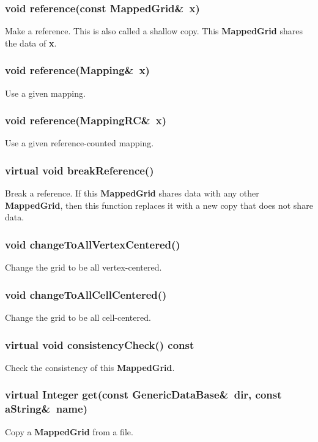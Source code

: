 \documentclass{article}
\begin{document}
  \subsubsection{void reference(const MappedGrid\&~x)}
  \label{MappedGrid::reference(MappedGrid_x)}
    Make a reference.  This is also called a shallow copy.  This \textbf{MappedGrid} shares the data of \textbf{x}.
  \subsubsection{void reference(Mapping\&~x)}
  \label{MappedGrid::reference(Mapping_x)}
    Use a given mapping.
  \subsubsection{void reference(MappingRC\&~x)}
  \label{MappedGrid::reference(MappingRC_x)}
    Use a given reference-counted mapping.
  \subsubsection{virtual void breakReference()}
  \label{MappedGrid::breakReference()}
    Break a reference.  If this \textbf{MappedGrid} shares data with any other \textbf{MappedGrid},
    then this function replaces it with a new copy that does not share data.
  \subsubsection{void changeToAllVertexCentered()}
  \label{MappedGrid::changeToAllVertexCentered()}
    Change the grid to be all vertex-centered.
  \subsubsection{void changeToAllCellCentered()}
  \label{MappedGrid::changeToAllCellCentered()}
    Change the grid to be all cell-centered.
  \subsubsection{virtual void consistencyCheck() const}
  \label{MappedGrid::consistencyCheck() const}
    Check the consistency of this \textbf{MappedGrid}.
  \subsubsection{virtual Integer get(const GenericDataBase\&~dir, const aString\&~name)}
  \label{MappedGrid::get(dir,name)}
    Copy a \textbf{MappedGrid} from a file.
\end{document}
